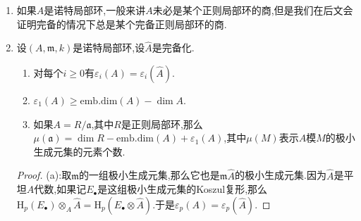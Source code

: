 \begin{enumerate}
\begin{proof}
    	只需证明(a)$\Rightarrow$(b).设$A=R/\mathfrak{a}$,其中$(R,\mathfrak{n},k)$是正则局部环.如果$\mathfrak{a}\not\subseteq\mathfrak{n}^2$,取$x\in\mathfrak{a}-\mathfrak{n}^2$,那么$R'=R/xR$也是正则局部环,并且$A$也是$R'$的商.所以适当模去有限个这样的$x$后导致$\mathfrak{a}\subseteq\mathfrak{n}^2$,所以我们不妨设起初就有这个包含关系.
    	
    	\qquad
    	
    	如果有这个包含关系,那么$\mathfrak{m}=\mathfrak{n}/\mathfrak{a}$,于是有$\mathfrak{m}/\mathfrak{m}^2\cong\mathfrak{n}/(\mathfrak{n}^2+\mathfrak{a})=\mathfrak{n}/\mathfrak{n}^2$,于是嵌入维数相同.反过来如果嵌入维数相同,那么明显有$\mathfrak{n}^2+\mathfrak{a}=\mathfrak{n}^2$,也即$\mathfrak{a}\subseteq\mathfrak{n}^2$.
    \end{proof}
    \item 如果$A$是诺特局部环,一般来讲$A$未必是某个正则局部环的商,但是我们在后文会证明完备的情况下总是某个完备正则局部环的商.
    \item 设$(A,\mathfrak{m},k)$是诺特局部环,设$\widehat{A}$是完备化.
    \begin{enumerate}
    	\item 对每个$i\ge0$有$\varepsilon_i(A)=\varepsilon_i(\widehat{A})$.
    	\item $\varepsilon_1(A)\ge\mathrm{emb.dim}(A)-\dim A$.
    	\item 如果$A=R/\mathfrak{a}$,其中$R$是正则局部环,那么$\mu(\mathfrak{a})=\dim R-\mathrm{emb.dim}(A)+\varepsilon_1(A)$,其中$\mu(M)$表示$A$模$M$的极小生成元集的元素个数.
    \end{enumerate}
    \begin{proof}
    	
    	(a):取$\mathfrak{m}$的一组极小生成元集,那么它也是$\mathfrak{m}\widehat{A}$的极小生成元集.因为$\widehat{A}$是平坦$A$代数,如果记$E_{\bullet}$是这组极小生成元集的Koszul复形,那么$\mathrm{H}_p(E_{\bullet})\otimes_A\widehat{A}=\mathrm{H}_p(E_{\bullet}\otimes\widehat{A})$.于是$\varepsilon_p(A)=\varepsilon_p(\widehat{A})$.
    	
    	\qquad
    	

\end{proof}
\end{enumerate}
